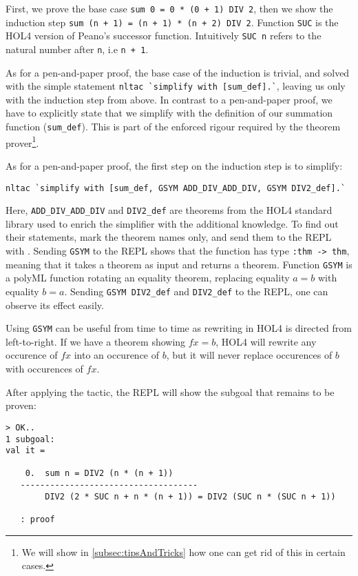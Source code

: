 First, we prove the base case \lstinline{sum 0 = 0 * (0 + 1) DIV 2}, then we
show the induction step \lstinline{sum (n + 1) = (n + 1) * (n + 2) DIV 2}.
Function \lstinline{SUC} is the HOL4 version of Peano's successor function.
Intuitively \lstinline{SUC n} refers to the natural number after \lstinline{n},
i.e \lstinline{n + 1}.

As for a pen-and-paper proof, the base case of the induction is trivial, and
solved with the simple statement \lstinline{nltac `simplify with [sum_def].`},
leaving us only with the induction step from above.
In contrast to a pen-and-paper proof, we have to explicitly state that we
simplify with the definition of our summation function (\lstinline{sum_def}).
This is part of the enforced rigour required by the theorem prover\footnote{
We will show in \autoref{subsec:tipsAndTricks} how one can get rid of this in certain cases.}.

As for a pen-and-paper proof, the first step on the induction step is to
simplify:
\begin{lstlisting}
nltac `simplify with [sum_def, GSYM ADD_DIV_ADD_DIV, GSYM DIV2_def].`
\end{lstlisting}

Here, \lstinline{ADD_DIV_ADD_DIV} and \lstinline{DIV2_def} are theorems from the
HOL4 standard library used to enrich the simplifier with the additional
knowledge.
To find out their statements, mark the theorem names only, and send them to the
REPL with .
Sending \lstinline{GSYM} to the REPL shows that the function has type
\lstinline{:thm -> thm}, meaning that it takes a theorem as input and returns a
theorem.
Function \lstinline{GSYM} is a polyML function rotating an equality theorem,
replacing equality $a = b$ with equality $b = a$.
Sending \lstinline{GSYM DIV2_def} and \lstinline{DIV2_def} to the REPL, one can
observe its effect easily.

Using \lstinline{GSYM} can be useful from time to time as rewriting in HOL4 is
directed from left-to-right.
If we have a theorem showing $f x = b$, HOL4 will rewrite any occurence of
$f x$ into an occurence of $b$, but it will never replace occurences of $b$
with occurences of $f x$.

After applying the tactic, the REPL will show the subgoal that remains to be proven:
\begin{lstlisting}
> OK..
1 subgoal:
val it =

    0.  sum n = DIV2 (n * (n + 1))
   ------------------------------------
        DIV2 (2 * SUC n + n * (n + 1)) = DIV2 (SUC n * (SUC n + 1))

   : proof
\end{lstlisting}

